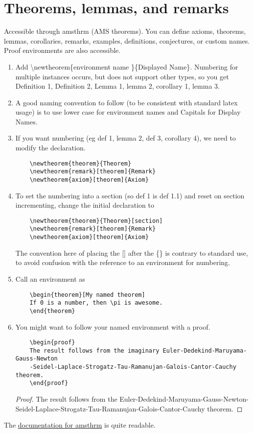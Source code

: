 \documentclass[11pt]{article}
\begin{document}
\section{Theorems, lemmas, and remarks}
Accessible through amsthrm (AMS theorems). You can define axioms, theorems, lemmas, corollaries, remarks, examples, definitions, conjectures, or custom names. Proof environments are also accessible. \\

\begin{enumerate}
	\item Add \textbackslash newtheorem\{environment name \}\{Displayed Name\}. Numbering for multiple instances occurs, but does not support other types, so you get Definition 1, Definition 2, Lemma 1, lemma 2, corollary 1, lemma 3. 
	\item A good naming convention to follow (to be consistent with standard latex usage) is to use lower case for environment names and Capitals for Display Names. 
	\item If you want numbering (eg def 1, lemma 2, def 3, corollary 4), we need to modify the declaration. 
	\begin{verbatim}
	\newtheorem{theorem}{Theorem}
	\newtheorem{remark}[theorem]{Remark}
	\newtheorem{axiom}[theorem]{Axiom}
	\end{verbatim}
	\item To set the numbering into a section (so def 1 is def 1.1) and reset on section incrementing, change the initial declaration to
	\begin{verbatim}
	\newtheorem{theorem}{Theorem}[section]
	\newtheorem{remark}[theorem]{Remark}
	\newtheorem{axiom}[theorem]{Axiom}
	\end{verbatim}
	The convention here of placing the [] after the \{\} is contrary to standard use, to avoid confusion with the reference to an environment for numbering.
	\item Call an environment as 
	\begin{verbatim}
	\begin{theorem}[My named theorem]
	If 0 is a number, then \pi is awesome.
	\end{theorem}
	\end{verbatim}
	\item You might want to follow your named environment with a proof.
	\begin{verbatim}
	\begin{proof}
	The result follows from the imaginary Euler-Dedekind-Maruyama-Gauss-Newton
	-Seidel-Laplace-Strogatz-Tau-Ramanujan-Galois-Cantor-Cauchy theorem.
	\end{proof} 
	\end{verbatim}
	\begin{proof}
	The result follows from the Euler-Dedekind-Maruyama-Gauss-Newton-Seidel-Laplace-Strogatz-Tau-Ramanujan-Galois-Cantor-Cauchy theorem.
	\end{proof}
\end{enumerate}
The \href{https://math.ucsd.edu/~jeggers/latex/amsthdoc.pdf}{documentation for amsthrm} is quite readable.
\end{document}
